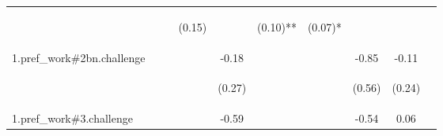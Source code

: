 \begin{center}
\begin{tabular}{lccccccccc}
 & \begin{footnotesize}\end{footnotesize} & \begin{footnotesize}\end{footnotesize} & \begin{footnotesize}(0.15)\end{footnotesize} & \begin{footnotesize}\end{footnotesize} & \begin{footnotesize}(0.10)**\end{footnotesize} & \begin{footnotesize}(0.07)*\end{footnotesize} & \begin{footnotesize}\end{footnotesize} & \begin{footnotesize}\end{footnotesize} & \begin{footnotesize}\end{footnotesize}\\
\noalign{\smallskip}1.pref_work\#2bn.challenge &  &  &  & -0.18 &  &  & -0.85 & -0.11 & \\
 & \begin{footnotesize}\end{footnotesize} & \begin{footnotesize}\end{footnotesize} & \begin{footnotesize}\end{footnotesize} & \begin{footnotesize}(0.27)\end{footnotesize} & \begin{footnotesize}\end{footnotesize} & \begin{footnotesize}\end{footnotesize} & \begin{footnotesize}(0.56)\end{footnotesize} & \begin{footnotesize}(0.24)\end{footnotesize} & \begin{footnotesize}\end{footnotesize}\\
\noalign{\smallskip}1.pref_work\#3.challenge &  &  &  & -0.59 &  &  & -0.54 & 0.06 & \\

\end{tabular}
\end{center}
